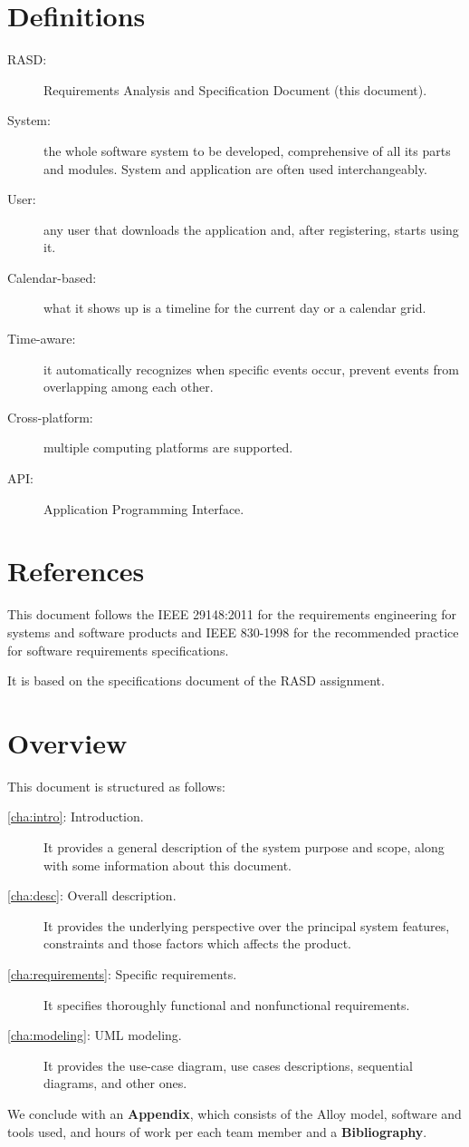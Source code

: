 \section{Definitions}
\label{sec:defs}
\begin{description}
\item[RASD:] Requirements Analysis and Specification Document (this document).
\item[System:] the whole software system to be developed, comprehensive of all its parts and modules. System and application are often used interchangeably. 
\item[User:] any user that downloads the application and, after registering, starts using it.
\item[Calendar-based:] what it shows up is a timeline for the current day or a calendar grid. 
\item[Time-aware:] it automatically recognizes when specific events occur, prevent events from overlapping among each other.
\item[Cross-platform:] multiple computing platforms are supported.
\item[API:] Application Programming Interface.
\end{description}

\section{References}
\label{sec:refer}

This document follows the IEEE 29148:2011\cite{ieee-29148} for the requirements engineering for systems and software products and IEEE 830-1998\cite{ieee-830} for the recommended practice for software requirements specifications.

It is based on the specifications document of the RASD assignment\cite{assignment}.

\section{Overview}
\label{sec:overview}

This document is structured as follows:
\begin{description}
\item[\autoref{cha:intro}: Introduction.] It provides a general description of the system purpose and scope, along with some information about this document.
\item[\autoref{cha:desc}: Overall description.] It provides the underlying perspective over the principal system features, constraints and those factors which affects the product.
\item[\autoref{cha:requirements}: Specific requirements.] It specifies thoroughly functional and nonfunctional requirements.
\item[\autoref{cha:modeling}: UML modeling.] It provides the use-case diagram, use cases descriptions, sequential diagrams, and other ones.
\end{description}
We conclude with an \textbf{Appendix}, which consists of the Alloy model, software and tools used, and hours of work per each team member and a \textbf{Bibliography}.
